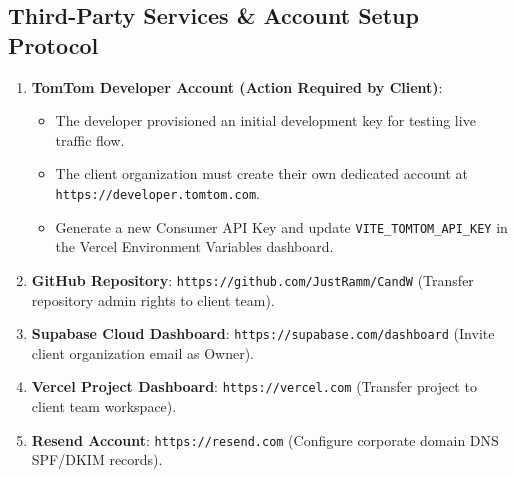\documentclass[11pt,a4paper]{article}
\begin{document}
\subsection{Third-Party Services \& Account Setup Protocol}
\begin{enumerate}[leftmargin=1.5em, itemsep=3pt]
    \item \textbf{TomTom Developer Account (Action Required by Client)}:
    \begin{itemize}[leftmargin=1em, itemsep=2pt]
        \item The developer provisioned an initial development key for testing live traffic flow.
        \item The client organization must create their own dedicated account at \texttt{https://developer.tomtom.com}.
        \item Generate a new Consumer API Key and update \texttt{VITE\_TOMTOM\_API\_KEY} in the Vercel Environment Variables dashboard.
    \end{itemize}
    \item \textbf{GitHub Repository}: \texttt{https://github.com/JustRamm/CandW} (Transfer repository admin rights to client team).
    \item \textbf{Supabase Cloud Dashboard}: \texttt{https://supabase.com/dashboard} (Invite client organization email as Owner).
    \item \textbf{Vercel Project Dashboard}: \texttt{https://vercel.com} (Transfer project to client team workspace).
    \item \textbf{Resend Account}: \texttt{https://resend.com} (Configure corporate domain DNS SPF/DKIM records).
\end{enumerate}
\end{document}
